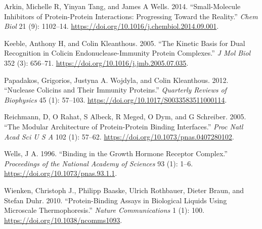 \documentclass[
]{article}
\newlength{\cslhangindent}
\newenvironment{cslreferences}%
  {\setlength{\parindent}{0pt}%
  \everypar{\setlength{\hangindent}{\cslhangindent}}\ignorespaces}%
  {\par}
\begin{document}
\hypertarget{refs}{}
\begin{cslreferences}
\leavevmode\hypertarget{ref-Arkin-2014}{}%
Arkin, Michelle R, Yinyan Tang, and James A Wells. 2014. ``Small-Molecule Inhibitors of Protein-Protein Interactions: Progressing Toward the Reality.'' \emph{Chem Biol} 21 (9): 1102--14. \url{https://doi.org/10.1016/j.chembiol.2014.09.001}.

\leavevmode\hypertarget{ref-Keeble-2005}{}%
Keeble, Anthony H, and Colin Kleanthous. 2005. ``The Kinetic Basis for Dual Recognition in Colicin Endonuclease-Immunity Protein Complexes.'' \emph{J Mol Biol} 352 (3): 656--71. \url{https://doi.org/10.1016/j.jmb.2005.07.035}.

\leavevmode\hypertarget{ref-Papadakos-2012}{}%
Papadakos, Grigorios, Justyna A. Wojdyla, and Colin Kleanthous. 2012. ``Nuclease Colicins and Their Immunity Proteins.'' \emph{Quarterly Reviews of Biophysics} 45 (1): 57--103. \url{https://doi.org/10.1017/S0033583511000114}.

\leavevmode\hypertarget{ref-Reichmann-2005}{}%
Reichmann, D, O Rahat, S Albeck, R Meged, O Dym, and G Schreiber. 2005. ``The Modular Architecture of Protein-Protein Binding Interfaces.'' \emph{Proc Natl Acad Sci U S A} 102 (1): 57--62. \url{https://doi.org/10.1073/pnas.0407280102}.

\leavevmode\hypertarget{ref-Wells-1996}{}%
Wells, J A. 1996. ``Binding in the Growth Hormone Receptor Complex.'' \emph{Proceedings of the National Academy of Sciences} 93 (1): 1--6. \url{https://doi.org/10.1073/pnas.93.1.1}.

\leavevmode\hypertarget{ref-Wienken-2010}{}%
Wienken, Christoph J., Philipp Baaske, Ulrich Rothbauer, Dieter Braun, and Stefan Duhr. 2010. ``Protein-Binding Assays in Biological Liquids Using Microscale Thermophoresis.'' \emph{Nature Communications} 1 (1): 100. \url{https://doi.org/10.1038/ncomms1093}.
\end{cslreferences}
\end{document}
